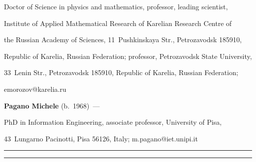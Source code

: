 Doctor of Science in physics and mathematics, professor, leading scientist,

 Institute of  Applied Mathematical Research of Karelian Research Centre of 

 the Russian Academy of Sciences, 11~Pushkinskaya Str.,  Petrozavodsk 185910, 

 Republic of Karelia, Russian Federation; professor, Petrozavodsk State University, 

 33~Lenin Str., Petrozavodsk 185910, Republic of Karelia, Russian Federation; 

 \mbox{emorozov@karelia.ru}

 

 \vspace*{3pt}

 

 \noindent

 \textbf{Pagano Michele} (b.\ 1968)~--- 

 PhD in Information Engineering, associate professor, University of Pisa, 

 43~Lungarno Pacinotti, Pisa 56126, Italy; \mbox{m.pagano@iet.unipi.it}



 





\vspace*{8pt}



\hrule



\vspace*{2pt}



\hrule












\def\tit{ГАУССОВСКАЯ АППРОКСИМАЦИЯ ПРОЦЕССА РАСПРЕДЕЛЕННЫХ ВЫЧИСЛЕНИЙ$^*$}



\def\titkol{Гауссовская аппроксимация процесса распределенных вычислений}



\def\aut{О.\,В.~Лукашенко$^{1,2}$, Е.\,В.~Морозов$^{1,2}$,

М.~Пагано$^3$}



